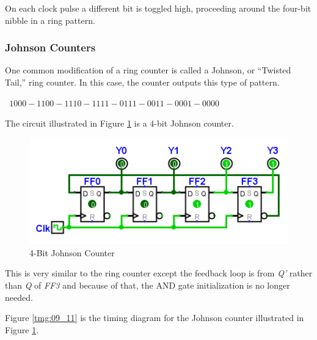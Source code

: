 On each clock pulse a different bit is toggled high, proceeding around the four-bit nibble in a ring pattern.

\subsubsection{Johnson Counters}
\label{SL:subsubsec:johnson_counters}

One common modification of a ring counter is called a Johnson, or ``Twisted Tail,'' ring counter. In this case, the counter outputs this type of pattern.

\medskip
\texttt{ $ 1000 - 1100 - 1110 - 1111 - 0111 - 0011 - 0001 - 0000 $ }
\medskip

The circuit illustrated in Figure \ref{fig:09_18} is a 4-bit Johnson counter.

\begin{figure}[H]
	\centering
	\includegraphics[width=\maxwidth{.95\linewidth}]{gfx/09_18}
	\caption{4-Bit Johnson Counter}
	\label{fig:09_18}
\end{figure}

This is very similar to the ring counter except the feedback loop is from \emph{Q'} rather than \emph{Q} of \emph{FF3} and because of that, the \textsf{AND} gate initialization is no longer needed. 

Figure \ref{tmg:09_11} is the timing diagram for the Johnson counter illustrated in Figure \ref{fig:09_18}.

